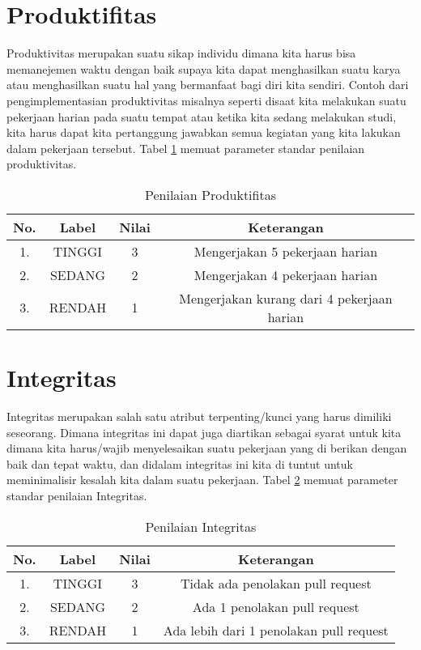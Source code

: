 \section{Produktifitas}
Produktivitas merupakan suatu sikap individu dimana kita harus bisa memanejemen waktu dengan baik supaya kita dapat menghasilkan suatu karya atau menghasilkan suatu hal yang bermanfaat bagi diri kita sendiri. Contoh dari pengimplementasian produktivitas misalnya seperti disaat kita melakukan suatu pekerjaan harian pada suatu tempat atau ketika kita sedang melakukan studi, kita harus dapat kita pertanggung jawabkan semua kegiatan yang kita lakukan dalam pekerjaan tersebut. Tabel \ref{table:nilaiproduktifitas} memuat parameter standar penilaian produktivitas.

\begin{table}[H]
\caption{Penilaian Produktifitas}
\centering
\begin{tabular}{|c|c|c|c|}
\hline
\textbf{No.}&\textbf{Label}&\textbf{Nilai}&\textbf{Keterangan}\\
\hline
1.&TINGGI&3&Mengerjakan 5 pekerjaan harian\\
\hline
2.&SEDANG&2&Mengerjakan 4 pekerjaan harian\\
\hline
3.&RENDAH&1&Mengerjakan kurang dari 4 pekerjaan harian\\
\hline
\end{tabular}
\label{table:nilaiproduktifitas}
\end{table}

\section{Integritas}
Integritas merupakan salah satu atribut terpenting/kunci yang harus dimiliki seseorang. Dimana integritas ini dapat juga diartikan sebagai syarat untuk kita dimana kita harus/wajib menyelesaikan suatu pekerjaan yang di berikan dengan baik dan tepat waktu, dan didalam integritas ini kita di tuntut untuk meminimalisir kesalah kita dalam suatu pekerjaan. Tabel \ref{table:nilaiintegritas} memuat parameter standar penilaian Integritas.

\begin{table}[H]
\caption{Penilaian Integritas}
\centering
\begin{tabular}{|c|c|c|c|}
\hline
\textbf{No.}&\textbf{Label}&\textbf{Nilai}&\textbf{Keterangan}\\
\hline
1.&TINGGI&3&Tidak ada penolakan pull request\\
\hline
2.&SEDANG&2&Ada 1 penolakan pull request\\
\hline
3.&RENDAH&1&Ada lebih dari 1 penolakan pull request\\
\hline
\end{tabular}
\label{table:nilaiintegritas}
\end{table}

